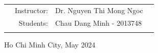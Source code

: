 \documentclass[a4paper]{report}
\begin{document}
\begin{titlepage}
  \begin{table}[h]
    \begin{tabular}{rrll}

      \hspace{5 cm}
       & Instructor: & Dr. Nguyen Thi Mong Ngoc \\
       & Students:   & Chau Dang Minh - 2013748 \\
       &             &
    \end{tabular}
  \end{table}
  \vspace{2cm}
  \begin{center}
    {\footnotesize Ho Chi Minh City, May 2024}
  \end{center}
\end{titlepage}



\tableofcontents








\printindex
\end{document}
